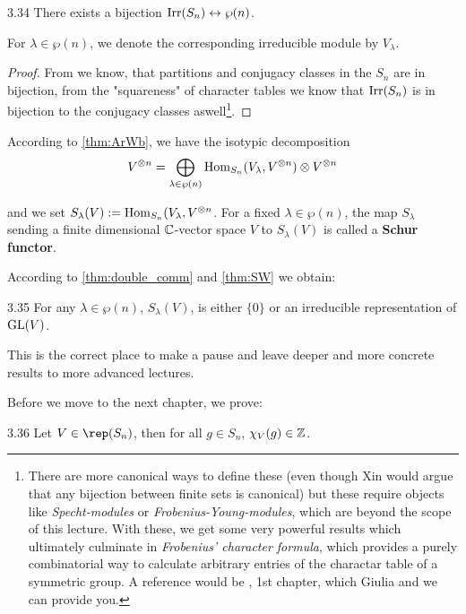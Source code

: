 \documentclass[twoside = false,	%
		headsepline,		%
		parskip = true,
		]{scrbook}						%
\begin{document}
        \begin{lemma}{}{3.34}
            There exists a bijection $\mathrm{Irr}(S_n) \leftrightarrow \wp(n)$.

            For $\lambda \in \wp(n)$, we denote the corresponding irreducible module by $V_\lambda$.
        \end{lemma}

        \begin{proof}
            From \cite{Cobra} we know, that partitions and conjugacy classes in the $S_n$ are in bijection, from the "squareness" of character tables we know that $\mathrm{Irr}(S_n)$ is in bijection to the conjugacy classes aswell\footnote{There are more canonical ways to define these (even though Xin would argue that any bijection between finite sets is canonical) but these require objects like \textit{Specht-modules} or \textit{Frobenius-Young-modules}, which are beyond the scope of this lecture. With these, we get some very powerful results which ultimately culminate in \textit{Frobenius' character formula}, which provides a purely combinatorial way to calculate arbitrary entries of the charactar table of a symmetric group. A reference would be \cite{Flag}, 1st chapter, which Giulia and we can provide you.}.
        \end{proof}

        According to \ref{thm:ArWb}, we have the isotypic decomposition $$V^{\otimes n}= \bigoplus_{\lambda\in\wp(n)} \mathrm{Hom}_{S_n}(V_\lambda, V^{\otimes n})\otimes V^{\otimes n}$$

        and we set $S_\lambda(V):=\mathrm{Hom}_{S_n}(V_\lambda, V^{\otimes n}$. For a fixed $\lambda\in\wp(n)$, the map $S_\lambda$ sending a finite dimensional $\mathbb C$-vector space $V$ to $S_\lambda(V)$ is called a \textbf{Schur functor}.

        According to \ref{thm:double_comm} and \ref{thm:SW} we obtain:

        \begin{corollary}{}{3.35}
            For any $\lambda \in \wp(n)$, $S_\lambda(V)$, is either $\{0\}$ or an irreducible representation of $\mathrm{GL}(V)$.
        \end{corollary}

        This is the correct place to make a pause and leave deeper and more concrete results to more advanced lectures.

        Before we move to the next chapter, we prove:

        \begin{proposition}{}{3.36}
            Let $V \in \rep(S_n)$, then for all $g \in S_n$, $\chi_V(g) \in \mathbb Z$.
        \end{proposition}
\end{document}
